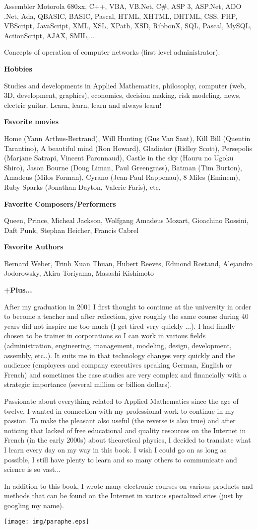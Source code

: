 Assembler Motorola 680xx, C++, VBA, VB.Net, C\#, ASP 3, ASP.Net, ADO .Net, Ada, QBASIC, BASIC, Pascal, HTML, XHTML, DHTML, CSS, PHP, VBScript, JavaScript, XML, XSL, XPath, XSD, RibbonX, SQL, Pascal, MySQL, ActionScript, AJAX, SMIL,...

Concepts of operation of computer networks (first level administrator).

\textbf{Hobbies}

Studies and developments in Applied Mathematics, philosophy, computer (web, 3D, development, graphics), economics, decision making, risk modeling, news, electric guitar. Learn, learn, learn and always learn!

\textbf{Favorite movies}

Home (Yann Arthus-Bertrand), Will Hunting (Gus Van Sant), Kill Bill (Quentin Tarantino), A beautiful mind (Ron Howard), Gladiator (Ridley Scott), Persepolis (Marjane Satrapi, Vincent Paronnaud), Castle in the sky (Hauru no Ugoku Shiro), Jason Bourne (Doug Liman, Paul Greengrass), Batman (Tim Burton), Amadeus (Milos Forman), Cyrano (Jean-Paul Rappenau), 8 Miles (Eminem), Ruby Sparks (Jonathan Dayton, Valerie Faris), etc.

\textbf{Favorite Composers/Performers}

Queen, Prince, Micheal Jackson, Wolfgang Amadeus Mozart, Gioachino Rossini, Daft Punk, Stephan Heicher, Francis Cabrel

\textbf{Favorite Authors}

Bernard Weber, Trinh Xuan Thuan, Hubert Reeves, Edmond Rostand, Alejandro Jodorowsky, Akira Toriyama, Masashi Kishimoto

\textbf{+Plus...}

	After my graduation in 2001 I first thought to continue at the university in order to become a teacher and after reflection, give roughly the same course during 40 years did not inspire me too  much (I get tired very quickly ...). I had finally chosen to be trainer in corporations so I can work in various fields (administration, engineering, management, modeling, design, development, assembly, etc..). It suits me in that technology changes very quickly and the audience (employees and company executives speaking German, English or French) and sometimes the case studies are very complex and financially with a strategic importance (several million or billion dollars).

	Passionate about everything related to Applied Mathematics since the age of twelve, I wanted in connection with my professional work to continue in my passion. To make the pleasant also useful (the reverse is also true) and after noticing that lacked of free educational and quality resources on the Internet in French (in the early 2000s) about theoretical physics, I decided to translate what I learn every day on my way in this book. I wish I could go on as long as possible, I still have plenty to learn and so many others to communicate and science is so vast...

In addition to this book, I wrote many electronic courses on various products and methods that can be found on the Internet in various specialized sites (just by googling my name).
\begin{flushright}
\texttt{[image: img/paraphe.eps]}
\end{flushright}